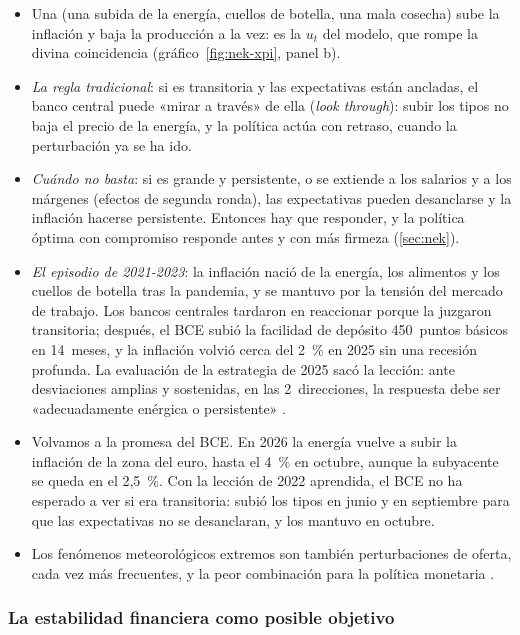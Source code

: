 \documentclass[11pt]{article}
\begin{document}
\begin{itemize}
\item Una  (una subida de la energía, cuellos de botella, una mala cosecha) sube la inflación y baja la producción a la vez: es la $u_t$ del modelo, que rompe la divina coincidencia (gráfico~\ref{fig:nek-xpi}, panel b).
\item \emph{La regla tradicional}: si es transitoria y las expectativas están ancladas, el banco central puede «mirar a través» de ella (\emph{look through}): subir los tipos no baja el precio de la energía, y la política actúa con retraso, cuando la perturbación ya se ha ido.
\item \emph{Cuándo no basta}: si es grande y persistente, o se extiende a los salarios y a los márgenes (efectos de segunda ronda), las expectativas pueden desanclarse y la inflación hacerse persistente. Entonces hay que responder, y la política óptima con compromiso responde antes y con más firmeza (\ref{sec:nek}).
\item \emph{El episodio de 2021-2023}: la inflación nació de la energía, los alimentos y los cuellos de botella tras la pandemia, y se mantuvo por la tensión del mercado de trabajo\nocite{BernankeBlanchard2025What}. Los bancos centrales tardaron en reaccionar porque la juzgaron transitoria; después, el BCE subió la facilidad de depósito 450~puntos básicos en 14~meses, y la inflación volvió cerca del 2~\% en 2025 sin una recesión profunda\nocite{BCE2026TiposOficiales,Eurostat2026IAPC}. La evaluación de la estrategia de 2025 sacó la lección: ante desviaciones amplias y sostenidas, en las 2~direcciones, la respuesta debe ser «adecuadamente enérgica o persistente»\nocite{BCE2025Evaluacion} .
\item Volvamos a la promesa del BCE. En 2026 la energía vuelve a subir la inflación de la zona del euro, hasta el 4~\% en octubre, aunque la subyacente se queda en el 2,5~\%\nocite{Eurostat2026IAPCoct}. Con la lección de 2022 aprendida, el BCE no ha esperado a ver si era transitoria: subió los tipos en junio y en septiembre para que las expectativas no se desanclaran, y los mantuvo en octubre\nocite{BCE2026Decisiones}.
\item Los fenómenos meteorológicos extremos son también perturbaciones de oferta, cada vez más frecuentes, y la peor combinación para la política monetaria .
\end{itemize}

\subsubsection{La estabilidad financiera como posible objetivo}\label{sec:estabilidad-financiera}
\end{document}
